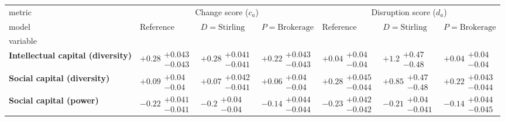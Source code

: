 \begin{tabular}{lllllll}
\toprule
metric & \multicolumn{3}{c}{Change score ($c_a$)} & \multicolumn{3}{c}{Disruption score ($d_a$)} \\
model &                                Reference &                      $D=\text{Stirling}$ &                     $P=\text{Brokerage}$ &                                Reference &                      $D=\text{Stirling}$ &                     $P=\text{Brokerage}$ \\
variable                                  &                                          &                                          &                                          &                                          &                                          &                                          \\
\midrule
\textbf{Intellectual capital (diversity)} &  $\bm{+0.28}\substack{+0.043 \\ -0.043}$ &  $\bm{+0.28}\substack{+0.041 \\ -0.041}$ &  $\bm{+0.22}\substack{+0.043 \\ -0.043}$ &    $\bm{+0.04}\substack{+0.04 \\ -0.04}$ &     $\bm{+1.2}\substack{+0.47 \\ -0.48}$ &         $+0.04\substack{+0.04 \\ -0.04}$ \\
\textbf{Social capital (diversity)}       &    $\bm{+0.09}\substack{+0.04 \\ -0.04}$ &  $\bm{+0.07}\substack{+0.042 \\ -0.041}$ &    $\bm{+0.06}\substack{+0.04 \\ -0.04}$ &  $\bm{+0.28}\substack{+0.045 \\ -0.044}$ &    $\bm{+0.85}\substack{+0.47 \\ -0.48}$ &  $\bm{+0.22}\substack{+0.043 \\ -0.044}$ \\
\textbf{Social capital (power)}           &  $\bm{-0.22}\substack{+0.041 \\ -0.041}$ &     $\bm{-0.2}\substack{+0.04 \\ -0.04}$ &  $\bm{-0.14}\substack{+0.044 \\ -0.044}$ &  $\bm{-0.23}\substack{+0.042 \\ -0.042}$ &   $\bm{-0.21}\substack{+0.04 \\ -0.041}$ &  $\bm{-0.14}\substack{+0.044 \\ -0.045}$ \\

\end{tabular}
